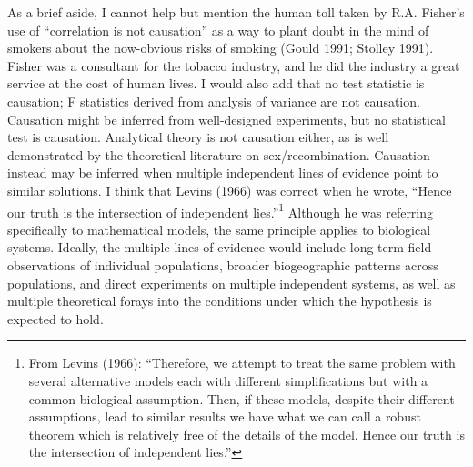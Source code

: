 \documentclass[
  letterpaper,
]{book}
\begin{document}
As a brief aside, I cannot help but mention the human toll taken by R.A.
Fisher's use of ``correlation is not causation'' as a way to plant doubt
in the mind of smokers about the now-obvious risks of smoking (Gould
1991; Stolley 1991). Fisher was a consultant for the tobacco industry,
and he did the industry a great service at the cost of human lives. I
would also add that no test statistic is causation; F statistics derived
from analysis of variance are not causation. Causation might be inferred
from well-designed experiments, but no statistical test is causation.
Analytical theory is not causation either, as is well demonstrated by
the theoretical literature on sex/recombination. Causation instead may
be inferred when multiple independent lines of evidence point to similar
solutions. I think that Levins (1966) was correct when he wrote, ``Hence
our truth is the intersection of independent lies.''\footnote{From
  Levins (1966): ``Therefore, we attempt to treat the same problem with
  several alternative models each with different simplifications but
  with a common biological assumption. Then, if these models, despite
  their different assumptions, lead to similar results we have what we
  can call a robust theorem which is relatively free of the details of
  the model. Hence our truth is the intersection of independent lies.''}
Although he was referring specifically to mathematical models, the same
principle applies to biological systems. Ideally, the multiple lines of
evidence would include long-term field observations of individual
populations, broader biogeographic patterns across populations, and
direct experiments on multiple independent systems, as well as multiple
theoretical forays into the conditions under which the hypothesis is
expected to hold.
\end{document}
